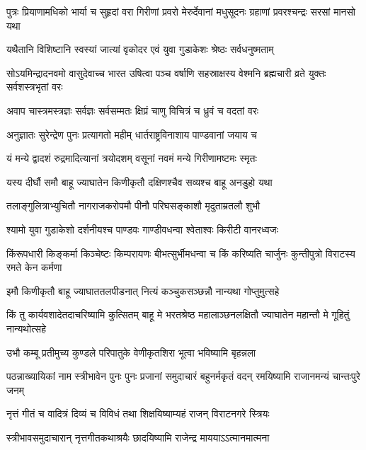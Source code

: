 \threelineshloka
{पुत्रः प्रियाणामधिको भार्या च सुहृदां वरा}
{गिरीणां प्रवरो मेरुर्देवानां मधुसूदनः}
{ग्रहाणां प्रवरश्चन्द्रः सरसां मानसो यथा}


\twolineshloka
{यथैतानि विशिष्टानि स्वस्यां जात्यां वृकोदर}
{एवं युवा गुडाकेशः श्रेष्ठः सर्वधनुष्मताम्}


\threelineshloka
{सोऽयमिन्द्रादनवमो वासुदेवाच्च भारत}
{उषित्वा पञ्च वर्षाणि सहस्राक्षस्य वेश्मनि}
{ब्रह्मचारी व्रते युक्तः सर्वशस्त्रभृतां वरः}


\twolineshloka
{अवाप चास्त्रमस्त्रज्ञः सर्वज्ञः सर्वसम्मतः}
{क्षिप्रं चाणु विचित्रं च ध्रुवं च वदतां वरः}


\twolineshloka
{अनुज्ञातः सुरेन्द्रेण पुनः प्रत्यागतो महीम्}
{धार्तराष्ट्रविनाशाय पाण्डवानां जयाय च}


\twolineshloka
{यं मन्ये द्वादशं रुद्रमादित्यानां त्रयोदशम्}
{वसूनां नवमं मन्ये गिरीणामष्टमः स्मृतः}


\twolineshloka
{यस्य दीर्घौ समौ बाहू ज्याघातेन किणीकृतौ}
{दक्षिणश्चैव सव्यश्च बाहू अनडुहो यथा}



\twolineshloka
{तलाङ्गुलित्राभ्युचितौ नागराजकरोपमौ}
{पीनौ परिघसङ्काशौ मृदुताम्रतलौ शुभौ}


\twolineshloka
{श्यामो युवा गुडाकेशो दर्शनीयश्च पाण्डवः}
{गाण्डीवधन्वा श्वेताश्वः किरीटी वानरध्वजः}


\threelineshloka
{किंरूपधारी किङ्कर्मा किञ्चेष्टः किम्परायणः}
{बीभत्सुर्भीमधन्वा च किं करिष्यति चार्जुनः}
{कुन्तीपुत्रो विराटस्य रमते केन कर्मणा}




\twolineshloka
{इमौ किणीकृतौ बाहू ज्याघाततलपीडनात्}
{नित्यं कञ्चुकसञ्छन्नौ नान्यथा गोप्तुमुत्सहे}


\onelineshloka
{किं तु कार्यवशादेतदाचरिष्यामि कुत्सितम्}
\twolineshloka
{बाहू मे भरतश्रेष्ठ महालाञ्छनलक्षितौ}
{ज्याघातेन महान्तौ मे गूहितुं नान्यथोत्सहे}


\twolineshloka
{उभौ कम्बू प्रतीमुच्य कुण्डले परिपातुके}
{वेणीकृतशिरा भूत्वा भविष्यामि बृहन्नला}


\threelineshloka
{पठन्नाख्यायिकां नाम स्त्रीभावेन पुनः पुनः}
{प्रजानां समुदाचारं बहुनर्मकृतं वदन्}
{रमयिष्यामि राजानमन्यं चान्तःपुरे जनम्}


\twolineshloka
{नृत्तं गीतं च वादित्रं दिव्यं च विविधं तथा}
{शिक्षयिष्याम्यहं राजन् विराटनगरे स्त्रियः}


\twolineshloka
{स्त्रीभावसमुदाचारान् नृत्तगीतकथाश्रयैः}
{छादयिष्यामि राजेन्द्र माययाऽऽत्मानमात्मना}


